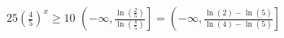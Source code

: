{$25\left(\frac{4}{5}\right)^{x} \geq 10$}
{$\left(-\infty, \frac{\ln\left(\frac{2}{5}\right)}{\ln\left(\frac{4}{5}\right)} \right] = \left(-\infty, \frac{\ln(2)-\ln(5)}{\ln(4)-\ln(5)} \right]$}
